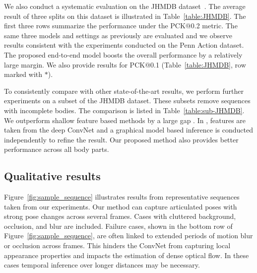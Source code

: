 \documentclass[10pt,twocolumn,letterpaper]{article}
\newcommand{\figref}[1]{Figure~\ref{#1}}
\newcommand{\reftab}[1]{Table~\ref{#1}}
\begin{document}
We also conduct a systematic evaluation on the JHMDB dataset~\cite{Jhuang:ICCV:2013}. The average result of three splits on this dataset is illustrated in \reftab{table:JHMDB}. The first three rows summarize the performance under the PCK@0.2 metric. The same three models and settings as previously are evaluated and we observe results consistent with the experiments conducted on the Penn Action dataset. The proposed end-to-end model boosts the overall performance by a relatively large margin. We also provide results for PCK@0.1 (\reftab{table:JHMDB}, row marked with $\ast$).
\begin{table}[h]
\begin{center}
\end{center}
\caption{PCK@0.2 results on sub-JHMDB dataset. We compare with other previous methods and our own baselines.}
\label{table:sub-JHMDB}
\end{table}%
To consistently compare with other state-of-the-art results, we perform further experiments on a subset of the JHMDB dataset. These subsets remove sequences with incomplete bodies. The comparison is listed in \reftab{table:sub-JHMDB}. We outperform shallow feature based methods by a large gap \cite{park2011n,xiaohan2015joint}. In \cite{iqbal2016pose}, features are taken from the deep ConvNet and a graphical model based inference is conducted independently to refine the result. Our proposed method also provides better performance across all body parts.

\subsection{Qualitative results}\figref{fig:sample_sequence} illustrates results from representative sequences taken from our experiments. Our method can capture articulated poses with strong pose changes across several frames. Cases with cluttered background, occlusion, and blur are included. Failure cases, shown in the bottom row of \figref{fig:sample_sequence}, are often linked to extended periods of motion blur or occlusion across frames. This hinders the ConvNet from capturing local appearance properties and impacts the estimation of dense optical flow. In these cases temporal inference over longer distances may be necessary. 
\end{document}
